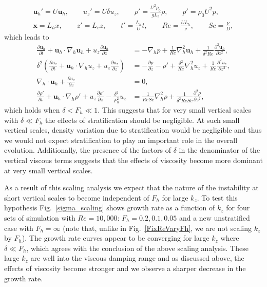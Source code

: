 \begin{align}
\bm{u}_{h}' = U\bm{u}_{h},\qquad u_{z}'=U\delta u_{z},\qquad \rho' =\frac{U^{2}\rho_{0}}{gL_{v}}\rho,\qquad p'=\rho_{0}U^{2}p, \nonumber\\
\textbf{x}=L_{h}x,\qquad z'=L_{v}z,\qquad t' = \frac{L_{h}}{U}{t},\qquad Re=\frac{UL_{h}}{\nu},\qquad Sc = \frac{\nu}{D},
\end{align} 
which leads to  
\begin{align}
\frac{\partial \bm{u}_{h}}{\partial t} + \bm{u}_{h}\cdot\nabla_{h}\bm{u}_{h}+u_{z}\frac{\partial \bm{u}_{h}}{\partial z} &= -\nabla_{h}p + \frac{1}{Re}\nabla_{h}^{2}\bm{u}_{h} +  \frac{1}{\delta^{2}Re}\frac{\partial^{2}\bm{u}_{h}}{\partial z^{2}},\\
\delta^{2}\left(\frac{\partial u_{z}}{\partial t} + \bm{u}_{h}\cdot\nabla_{h}u_{z}+u_{z}\frac{\partial u_{z}}{\partial z}\right) &= -\frac{\partial p}{\partial z} - \rho' + \frac{\delta^{2}}{Re}\nabla_{h}^{2}u_{z} + \frac{1}{Re}\frac{\partial^{2}u_{z}}{\partial z^{2}},\\
\nabla_{h}\cdot\bm{u}_{h} + \frac{\partial u_{z}}{\partial z} &=0,\\
\frac{\partial \rho'}{\partial t} + \bm{u}_{h}\cdot\nabla_{h}\rho' + u_{z}\frac{\partial \rho'}{\partial z} -\frac{\delta^{2}}{F_{h}^{2}}u_{z}&=\frac{1}{ReSc}\nabla_{h}^{2}\rho + \frac{1}{\delta^{2}ReSc}\frac{\partial^{2}\rho}{\partial z^{2}}, 
\end{align}
which holds when $\delta<F_{h}\ll 1$. This suggests that for very small vertical scales with $\delta \ll  F_{h}$ the effects of stratification should be negligible. At such small vertical scales, density variation due to stratification would be negligible and thus we would not expect stratification to play an important role in the overall evolution. Additionally, the presence of the factors of $\delta$ in the denominator of the vertical viscous terms suggests that the effects of viscosity become more dominant at very small vertical scales.  

As a result of this scaling analysis we expect that the nature of the instability at short vertical scales to become independent of $F_{h}$ for large $k_{z}$. To test this hypothesis Fig.~\ref{sigma_scaling} shows growth rate as a function of $k_{z}$ for four sets of simulation with $Re=10{,}000$: $F_{h}=0.2,0.1,0.05$ and a new unstratified case with $F_{h}=\infty$ (note that, unlike in Fig.~\ref{FixReVaryFh}, we are not scaling $k_{z}$ by $F_{h}$). The growth rate curves appear to be converging for large $k_{z}$ where $\delta \ll F_{h}$, which agrees with the conclusion of the above scaling analysis. These large $k_{z}$ are well into the viscous damping range and as discussed above, the effects of viscosity become stronger and we observe a sharper decrease in the growth rate.

